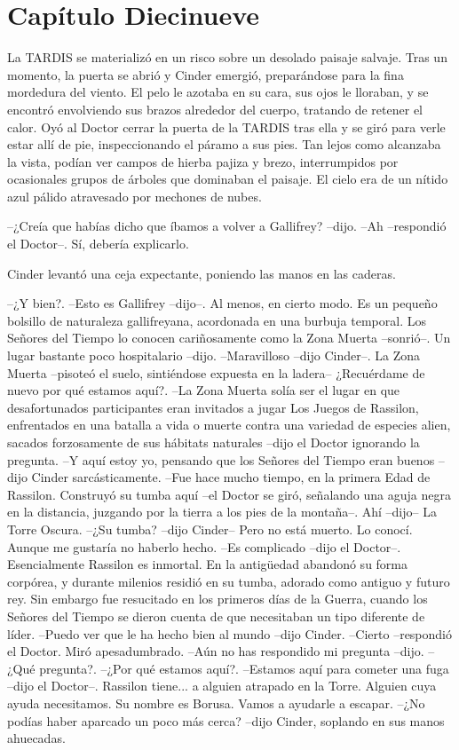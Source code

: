 \chapter*{Capítulo Diecinueve}

La TARDIS se materializó en un risco sobre un desolado paisaje salvaje.
Tras un momento, la puerta se abrió y Cinder emergió, preparándose para la fina mordedura del viento. El pelo le azotaba en su cara, sus ojos le lloraban, y se encontró envolviendo sus brazos alrededor del cuerpo, tratando de retener el calor.
Oyó al Doctor cerrar la puerta de la TARDIS tras ella y se giró para verle estar allí de pie, inspeccionando el páramo a sus pies. Tan lejos como alcanzaba la vista, podían ver campos de hierba pajiza y brezo, interrumpidos por ocasionales grupos de árboles que dominaban el paisaje. El cielo era de un nítido azul pálido atravesado por mechones de nubes.

--¿Creía que habías dicho que íbamos a volver a Gallifrey? --dijo.
--Ah --respondió el Doctor--. Sí, debería explicarlo.

Cinder levantó una ceja expectante, poniendo las manos en las caderas. 

--¿Y bien?.
--Esto es Gallifrey --dijo--. Al menos, en cierto modo. Es un pequeño bolsillo de naturaleza gallifreyana, acordonada en una burbuja temporal. Los Señores del Tiempo lo conocen cariñosamente como la Zona Muerta --sonrió--. Un lugar bastante poco hospitalario --dijo.
--Maravilloso --dijo Cinder--. La Zona Muerta --pisoteó el suelo, sintiéndose expuesta en la ladera-- ¿Recuérdame de nuevo por qué estamos aquí?.
--La Zona Muerta solía ser el lugar en que desafortunados participantes eran invitados a jugar Los Juegos de Rassilon, enfrentados en una batalla a vida o muerte contra una variedad de especies alien, sacados forzosamente de sus hábitats naturales --dijo el Doctor ignorando la pregunta.
--Y aquí estoy yo, pensando que los Señores del Tiempo eran buenos --dijo Cinder sarcásticamente.
--Fue hace mucho tiempo, en la primera Edad de Rassilon. Construyó su tumba aquí --el Doctor se giró, señalando una aguja negra en la distancia, juzgando por la tierra a los pies de la montaña--. Ahí --dijo-- La Torre Oscura.
--¿Su tumba? --dijo Cinder-- Pero no está muerto. Lo conocí. Aunque me gustaría no haberlo hecho.
--Es complicado --dijo el Doctor--. Esencialmente Rassilon es inmortal. En la antigüedad abandonó su forma corpórea, y durante milenios residió en su tumba, adorado como antiguo y futuro rey. Sin embargo fue resucitado en los primeros días de la Guerra, cuando los Señores del Tiempo se dieron cuenta de que necesitaban un tipo diferente de líder.
--Puedo ver que le ha hecho bien al mundo --dijo Cinder.
--Cierto --respondió el Doctor. Miró apesadumbrado.
--Aún no has respondido mi pregunta --dijo.
--¿Qué pregunta?.
--¿Por qué estamos aquí?.
--Estamos aquí para cometer una fuga --dijo el Doctor--. Rassilon tiene... a alguien atrapado en la Torre. Alguien cuya ayuda necesitamos. Su nombre es Borusa. Vamos a ayudarle a escapar.
--¿No podías haber aparcado un poco más cerca? --dijo Cinder, soplando en sus manos ahuecadas.

